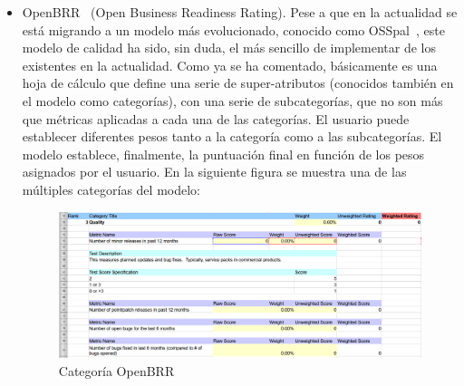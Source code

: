 \documentclass[11pt]{article}
\begin{document}
\begin{itemize}
\item{OpenBRR~\cite{openbrr:openbrr}} (Open Business Readiness Rating). Pese a que en la actualidad se está migrando a un modelo más evolucionado, conocido como OSSpal~\cite{osspal:osspal}, este modelo de calidad ha sido, sin duda, el más sencillo de implementar de los existentes en la actualidad. Como ya se ha comentado, básicamente es una hoja de cálculo que define una serie de super-atributos (conocidos también en el modelo como categorías), con una serie de subcategorías, que no son más que métricas aplicadas a cada una de las categorías. El usuario puede establecer diferentes pesos tanto a la categoría como a las subcategorías. El modelo establece, finalmente, la puntuación final en función de los pesos asignados por el usuario. En la siguiente figura se muestra una de las múltiples categorías del modelo:

\begin{center}
 \begin{figure}[H]
 \begin{center}
   \includegraphics[width=16cm]{img/openbrr_extract00.png}
   \caption{Categoría OpenBRR}
   \label{fig:openbrrcategory}
 \end{center}
 \end{figure}
\end{center}


\end{itemize}
\end{document}
